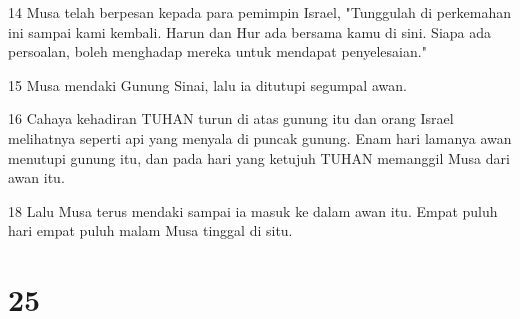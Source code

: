\par 14 Musa telah berpesan kepada para pemimpin Israel, "Tunggulah di perkemahan ini sampai kami kembali. Harun dan Hur ada bersama kamu di sini. Siapa ada persoalan, boleh menghadap mereka untuk mendapat penyelesaian."
\par 15 Musa mendaki Gunung Sinai, lalu ia ditutupi segumpal awan.
\par 16 Cahaya kehadiran TUHAN turun di atas gunung itu dan orang Israel melihatnya seperti api yang menyala di puncak gunung. Enam hari lamanya awan menutupi gunung itu, dan pada hari yang ketujuh TUHAN memanggil Musa dari awan itu.
\par 18 Lalu Musa terus mendaki sampai ia masuk ke dalam awan itu. Empat puluh hari empat puluh malam Musa tinggal di situ.

\chapter{25}

